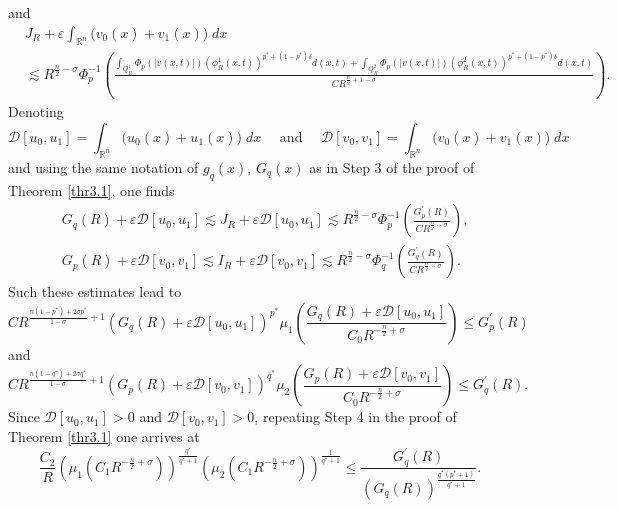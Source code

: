 \documentclass[11pt,reqno]{amsart}
\newcommand{\tron}[1]{\left( #1 \right)}
\numberwithin{equation}{section}
\newcommand{\dps}{\displaystyle}
\theoremstyle{plain}
\begin{document}
and
\begin{equation}
\begin{aligned}
&J_R+\varepsilon \int_{\mathbb{R}^n}\big(v_0(x)+v_1(x)\big)\;dx\\
&\lesssim R^{\frac{n}{2}-\sigma}\Phi_p^{-1}\left(\frac{\dps\int_{Q^1_{R}} \Phi_p(|v(x, t)|)\left(\phi^1_R(x, t)\right)^{p^*+(1-p^*)\delta} d(x, t)+\dps\int_{Q^2_{R}} \Phi_p(|v(x, t)|)\left(\phi^2_R(x, t)\right)^{p^*+(1-p^*)\delta} d(x, t)}{CR^{\frac{n}{2}+1-\sigma}}\right).
\end{aligned}
\end{equation}
Denoting 
\[
\mathcal{D}[u_0,u_1]=\int_{\mathbb{R}^n}\big(u_0(x)+u_1(x)\big)\;dx \quad\text{ and }\quad \mathcal{D}[v_0,v_1]=\int_{\mathbb{R}^n}\big(v_0(x)+v_1(x)\big)\;dx
\]
and using the same notation of $g_q(x)$, $G_q(x)$ as in Step 3 of the proof of Theorem \ref{thr3.1}, one finds
\[
\begin{aligned}
& G_q(R)+\varepsilon \mathcal{D}[u_0,u_1]\lesssim J_R+\varepsilon \mathcal{D}[u_0,u_1] \lesssim  R^{\frac{n}{2}-\sigma} \Phi_p^{-1}\left(\frac{G_p^{\prime}(R)}{CR^{\frac{n}{2}-\sigma}}\right), \\
& G_p(R)+\varepsilon \mathcal{D}[v_0,v_1]\lesssim I_R +\varepsilon \mathcal{D}[v_0,v_1]\lesssim  R^{\frac{n}{2}-\sigma}\Phi_q^{-1}\left(\frac{G_q^{\prime}(R)}{CR^{\frac{n}{2}-\sigma}}\right).
\end{aligned}
\]
Such these estimates lead to
\begin{equation}\label{eq2sec4.1}
    CR^{\frac{n(1-p^*)+ 2\sigma p^*}{1-\sigma}+1}\tron{G_q(R)+\varepsilon \mathcal{D}[u_0,u_1]}^{p^*}\mu_1\left(\frac{G_q(R)+\varepsilon \mathcal{D}[u_0,u_1]}{C_0R^{-\frac{n}{2}+\sigma}}\right) \leq G_p^{\prime}(R)
\end{equation}
and 
\begin{equation}\label{eq3sec4.1}
    CR^{\frac{n(1-q^*)+ 2\sigma q^*}{1-\sigma}+1}\tron{G_p(R)+\varepsilon \mathcal{D}[v_0,v_1]}^{q^*}\mu_2\left(\frac{G_p(R)+\varepsilon \mathcal{D}[v_0,v_1]}{C_0R^{-\frac{n}{2}+\sigma}}\right) \leq G_q^{\prime}(R).
\end{equation}
Since $\mathcal{D}[u_0,u_1]>0$ and $\mathcal{D}[v_0,v_1]>0$, repeating Step 4 in the proof of Theorem \ref{thr3.1} one arrives at
\begin{equation*}
\frac{C_2}{R}\left(\mu_1\left(C_1R^{-\frac{n}{2}+\sigma}\right)\right)^{\frac{q^*}{q^*+1}}\left(\mu_2\left(C_1 R^{-\frac{n}{2}+\sigma}\right)\right)^{\frac{1}{q^*+1}} \leq \frac{G_q^{\prime}(R)}{\left(G_q(R)\right)^{\frac{q^*\left(p^*+1\right)}{q^*+1}}} .
\end{equation*}
\end{document}
